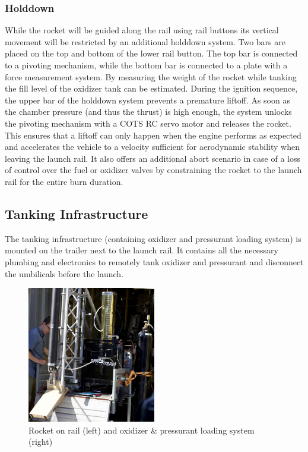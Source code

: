 \subsubsection{Holddown} \label{sec:holddown}
While the rocket will be guided along the rail using rail buttons its vertical movement will be restricted by an additional holddown system. Two bars are placed on the top and bottom of the lower rail button. The top bar is connected to a pivoting mechanism, while the bottom bar is connected to a plate with a force measurement system. By measuring the weight of the rocket while tanking the fill level of the oxidizer tank can be estimated. During the ignition sequence, the upper bar of the holddown system prevents a premature liftoff. As soon as the chamber pressure (and thus the thrust) is high enough, the system unlocks the pivoting mechanism with a COTS RC servo motor and releases the rocket. This ensures that a liftoff can only happen when the engine performs as expected and accelerates the vehicle to a velocity sufficient for aerodynamic stability when leaving the launch rail. It also offers an additional abort scenario in case of a loss of control over the fuel or oxidizer valves by constraining the rocket to the launch rail for the entire burn duration.

\subsection{Tanking Infrastructure}

The tanking infrastructure (containing oxidizer and pressurant loading system) is mounted on the trailer next to the launch rail. It contains all the necessary plumbing and electronics to remotely tank oxidizer and pressurant and disconnect the umbilicals before the launch.

\begin{figure}[h]
    \centering
    \includegraphics[width=0.5\textwidth]{GroundSystems/gse_uhoubolt.png}
    \caption{Rocket on rail (left) and oxidizer \& pressurant loading system (right)}
    \label{fig:gse_umbilicals}
\end{figure}

